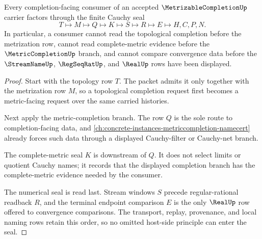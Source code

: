 \begin{theorem}
\label{thm:metrizable-completion-cauchy-seal}
Every completion-facing consumer of an accepted $\MetrizableCompletionUp$ carrier factors through the finite Cauchy seal
$$
T\longmapsto M\longmapsto Q\longmapsto K\longmapsto S\longmapsto R\longmapsto E\longmapsto H,C,P,N .
$$
In particular, a consumer cannot read the topological completion before the metrization row, cannot read complete-metric evidence before the $\MetricCompletionUp$ branch, and cannot compare convergence data before the $\StreamNameUp$, $\RegSeqRatUp$, and $\RealUp$ rows have been displayed.
\end{theorem}
\begin{proof}
Start with the topology row $T$. The packet admits it only together with the metrization row $M$, so a topological completion request first becomes a metric-facing request over the same carried histories.

Next apply the metric-completion branch. The row $Q$ is the sole route to completion-facing data, and \autoref{ch:concrete-instances-metriccompletion-namecert} already forces such data through a displayed Cauchy-filter or Cauchy-net branch.

The complete-metric seal $K$ is downstream of $Q$. It does not select limits or quotient Cauchy names; it records that the displayed completion branch has the complete-metric evidence needed by the consumer.

The numerical seal is read last. Stream windows $S$ precede regular-rational readback $R$, and the terminal endpoint comparison $E$ is the only $\RealUp$ row offered to convergence comparisons. The transport, replay, provenance, and local naming rows retain this order, so no omitted host-side principle can enter the seal.
\end{proof}

\begin{closurestatus}{\MetrizableCompletionUp}
  \theoryclosure{\seedClosure}
  \formalstatus{\unformalizedV}
\end{closurestatus}
